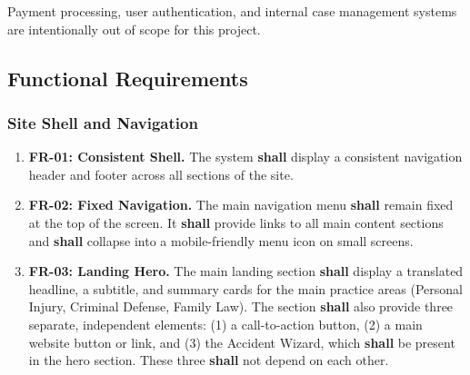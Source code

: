 \documentclass{article}
\begin{document}
Payment processing, user authentication, and internal case management systems are intentionally out of scope for this project.


\subsection{Functional Requirements}

\subsubsection{Site Shell and Navigation}
\begin{enumerate}
  \item \textbf{FR-01: Consistent Shell.} The system \textbf{shall} display a consistent navigation header and footer across all sections of the site.
  \item \textbf{FR-02: Fixed Navigation.} The main navigation menu \textbf{shall} remain fixed at the top of the screen. It \textbf{shall} provide links to all main content sections and \textbf{shall} collapse into a mobile-friendly menu icon on small screens.
  \item \label{fr:03} \textbf{FR-03: Landing Hero.} The main landing section \textbf{shall} display a translated headline, a subtitle, and summary cards for the main practice areas (Personal Injury, Criminal Defense, Family Law). The section \textbf{shall} also provide three separate, independent elements: (1) a call-to-action button, (2) a main website button or link, and (3) the Accident Wizard, which \textbf{shall} be present in the hero section. These three \textbf{shall} not depend on each other.
\end{enumerate}
\end{document}
